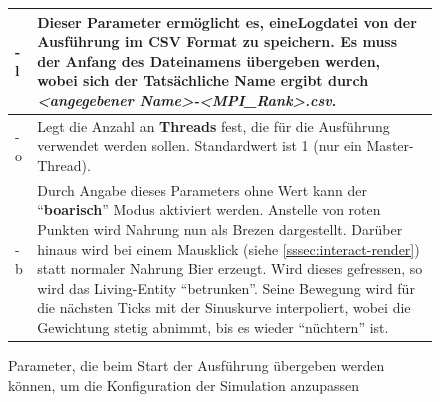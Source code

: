 \documentclass[course=erap]{aspdoc}
\begin{document}
\begin{figure}
\centering
\begin{longtable} {| p{2cm} | p{12cm} |}
\hline
-l & Dieser Parameter ermöglicht es, eine\textbf{Logdatei} von der Ausführung im CSV Format zu speichern.
Es muss der Anfang des Dateinamens übergeben werden, wobei sich der Tatsächliche Name ergibt durch \emph{<angegebener Name>-<MPI\_Rank>.csv}.\\
\hline
-o & Legt die Anzahl an \textbf{Threads} fest, die für die Ausführung verwendet werden sollen. Standardwert ist 1 (nur ein Master-Thread).\\
\hline
-b & Durch Angabe dieses Parameters ohne Wert kann der "`\textbf{boarisch}"' Modus aktiviert werden. Anstelle von roten Punkten wird Nahrung nun als Brezen dargestellt. Darüber hinaus wird bei einem Mausklick (siehe \ref{sssec:interact-render}) statt normaler Nahrung Bier erzeugt. Wird dieses gefressen, so wird das Living-Entity "`betrunken"'. Seine Bewegung wird für die nächsten Ticks mit der Sinuskurve interpoliert, wobei die Gewichtung stetig abnimmt, bis es wieder "`nüchtern"' ist.\\
\hline
\end{longtable}
\caption{Parameter, die beim Start der Ausführung übergeben werden können, um die Konfiguration der Simulation anzupassen}
\label{table:parameters}
\end{figure}
\end{document}

